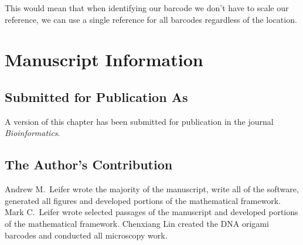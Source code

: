 This would mean that when identifying our barcode we don't have to scale our reference, we can use a single reference for all barcodes regardless of the location.


\section{Manuscript Information}
\subsection{Submitted for Publication As}
A version of this chapter has been submitted for publication in the journal \textit{Bioinformatics}.

\subsection{The Author's Contribution}
Andrew M.~Leifer wrote the majority of the manuscript, write all of the software, generated all figures and developed portions of the mathematical framework. Mark C.~Leifer wrote selected passages of the manuscript and developed portions of the mathematical framework. Chenxiang Lin created the DNA origami barcodes and conducted all microscopy work. 
 